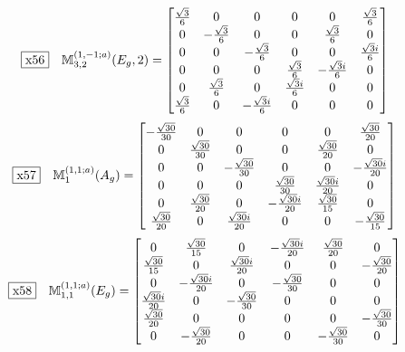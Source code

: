 \documentclass[fleqn,10pt,landscape]{jsarticle}
\begin{document}
\begin{dmath*}
\fbox{x56}\quad \mathbb{M}_{3,2}^{(1,-1;a)}(E_{g},2)=\begin{bmatrix} \frac{\sqrt{3}}{6} & 0 & 0 & 0 & 0 & \frac{\sqrt{3}}{6} \\ 0 & - \frac{\sqrt{3}}{6} & 0 & 0 & \frac{\sqrt{3}}{6} & 0 \\ 0 & 0 & - \frac{\sqrt{3}}{6} & 0 & 0 & \frac{\sqrt{3} i}{6} \\ 0 & 0 & 0 & \frac{\sqrt{3}}{6} & - \frac{\sqrt{3} i}{6} & 0 \\ 0 & \frac{\sqrt{3}}{6} & 0 & \frac{\sqrt{3} i}{6} & 0 & 0 \\ \frac{\sqrt{3}}{6} & 0 & - \frac{\sqrt{3} i}{6} & 0 & 0 & 0 \end{bmatrix}
\end{dmath*}
\begin{dmath*}
\fbox{x57}\quad \mathbb{M}_{1}^{(1,1;a)}(A_{g})=\begin{bmatrix} - \frac{\sqrt{30}}{30} & 0 & 0 & 0 & 0 & \frac{\sqrt{30}}{20} \\ 0 & \frac{\sqrt{30}}{30} & 0 & 0 & \frac{\sqrt{30}}{20} & 0 \\ 0 & 0 & - \frac{\sqrt{30}}{30} & 0 & 0 & - \frac{\sqrt{30} i}{20} \\ 0 & 0 & 0 & \frac{\sqrt{30}}{30} & \frac{\sqrt{30} i}{20} & 0 \\ 0 & \frac{\sqrt{30}}{20} & 0 & - \frac{\sqrt{30} i}{20} & \frac{\sqrt{30}}{15} & 0 \\ \frac{\sqrt{30}}{20} & 0 & \frac{\sqrt{30} i}{20} & 0 & 0 & - \frac{\sqrt{30}}{15} \end{bmatrix}
\end{dmath*}
\begin{dmath*}
\fbox{x58}\quad \mathbb{M}_{1,1}^{(1,1;a)}(E_{g})=\begin{bmatrix} 0 & \frac{\sqrt{30}}{15} & 0 & - \frac{\sqrt{30} i}{20} & \frac{\sqrt{30}}{20} & 0 \\ \frac{\sqrt{30}}{15} & 0 & \frac{\sqrt{30} i}{20} & 0 & 0 & - \frac{\sqrt{30}}{20} \\ 0 & - \frac{\sqrt{30} i}{20} & 0 & - \frac{\sqrt{30}}{30} & 0 & 0 \\ \frac{\sqrt{30} i}{20} & 0 & - \frac{\sqrt{30}}{30} & 0 & 0 & 0 \\ \frac{\sqrt{30}}{20} & 0 & 0 & 0 & 0 & - \frac{\sqrt{30}}{30} \\ 0 & - \frac{\sqrt{30}}{20} & 0 & 0 & - \frac{\sqrt{30}}{30} & 0 \end{bmatrix}
\end{dmath*}
\end{document}
